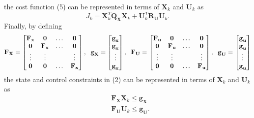 \documentclass{article}
\begin{document}
 the cost function (5) can be represented in terms of $ \textbf{X}_{k}$ and  $\textbf{U}_{k}$ as
\begin{equation}
    J_{k}=  \textbf{X}_{k}^{T}\textbf{Q}_{\textbf{X}} \textbf{X}_{k}+\textbf{U}_{k}^{T}\textbf{R}_{\textbf{U}} \textbf{U}_{k}.
\end{equation}
Finally, by defining 
\begin{equation}
\textbf{F}_{\textbf{X}} = \left[\begin{matrix}
\textbf{F}_{\textbf{x}} &\textbf{0} & \dots & \textbf{0} \\\textbf{0} & \textbf{F}_{\textbf{x}} & \dots & \textbf{0} \\ \vdots &\vdots  &  & \vdots \\\textbf{0} & \textbf{0} & \dots & \textbf{F}_{\textbf{x}}
\end{matrix}\right], \hspace{.2cm}
\textbf{g}_{\textbf{X}} = \left[\begin{matrix}
\textbf{g}_{\textbf{x}}\\\textbf{g}_{\textbf{x}} \\\vdots\\\textbf{g}_{\textbf{x}}
\end{matrix}\right],
\hspace{.2cm}
\textbf{F}_{\textbf{U}} = \left[\begin{matrix}
\textbf{F}_{\textbf{u}} & \textbf{0} & \dots & \textbf{0}\\ \textbf{0}& \textbf{F}_{\textbf{u}} & \dots & \textbf{0} \\\vdots &\vdots  & & \vdots \\ \textbf{0}& \textbf{0}& \dots & \textbf{F}_{\textbf{u}}
\end{matrix}\right], \hspace{.2cm}
\textbf{g}_{\textbf{U}} = \left[\begin{matrix}
\textbf{g}_{\textbf{u}}\\\textbf{g}_{\textbf{u}} \\\vdots\\\textbf{g}_{\textbf{u}}
\end{matrix}\right]
\end{equation}
the state and control constraints in (2) can be represented in terms of $ \textbf{X}_{k}$ and $\textbf{U}_{k}$  as
\begin{equation}
\begin{aligned}
  & \textbf{F}_{\textbf{X}}\textbf{X}_{k} \leq \textbf{g}_{\textbf{X}}\\
   & \textbf{F}_{\textbf{U}}\textbf{U}_{k} \leq \textbf{g}_{\textbf{U}}. 
\end{aligned}    
\end{equation}
\end{document}

